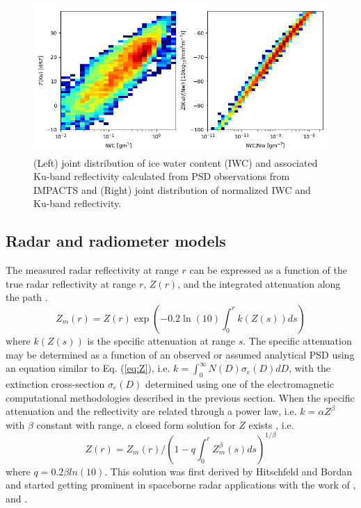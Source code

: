 \documentclass[10pt]{ietbook}
\begin{document}
\begin{figure} 
\centerline{ }
\includegraphics[width=\textwidth]{normZvsnormIWC.png}

\caption{ (Left) joint distribution of ice water content (IWC) and associated Ku-band reflectivity calculated from PSD observations from IMPACTS and
(Right) joint distribution of normalized IWC and Ku-band reflectivity. }
\label{fig:normZ}
\end{figure}

\subsection{Radar and radiometer models}
The measured radar reflectivity at range $r$ can be expressed as a function of the true radar reflectivity at range $r$, $Z(r)$, and the integrated attenuation
along the path \cite{iguchi_meneghini_1994}.
\begin{equation}\label{eq:radarEq}
Z_m(r)=Z(r) \exp(-0.2\ln(10)\int_0^r k(Z(s))ds)
\end{equation}
where $k(Z(s))$ is the specific attenuation at range $s$.  The specific attenuation may be determined as a function of an observed or assumed analytical PSD
using an equation similar to Eq. (\ref{eq:Z}), i.e. $k=\int_0^{\infty} N(D) \sigma_e(D)dD$, with the extinction cross-section $\sigma_e(D)$ determined using one of
the electromagnetic computational methodologies described in the previous section.  When the specific attenuation and the reflectivity are related through a 
power law, i.e. $k=\alpha Z^\beta$ with $\beta$ constant with range, a closed form solution for $Z$ exists \cite{iguchi_meneghini_1994}, i.e.
\begin{equation}\label{eq:hbsol}
Z(r)=Z_m(r) /(1-q\int_0^r Z_m^\beta(s)ds)^{1/\beta}
\end{equation}
where $q=0.2\beta ln(10)$.  This solution was first derived by Hitschfeld and Bordan \cite{hitschfeld1954} and started
getting prominent in spaceborne radar applications with the work of \cite{meneghini1983}, \cite{marzoug1991} 
and \cite{iguchi_meneghini_1994}.
\end{document}
